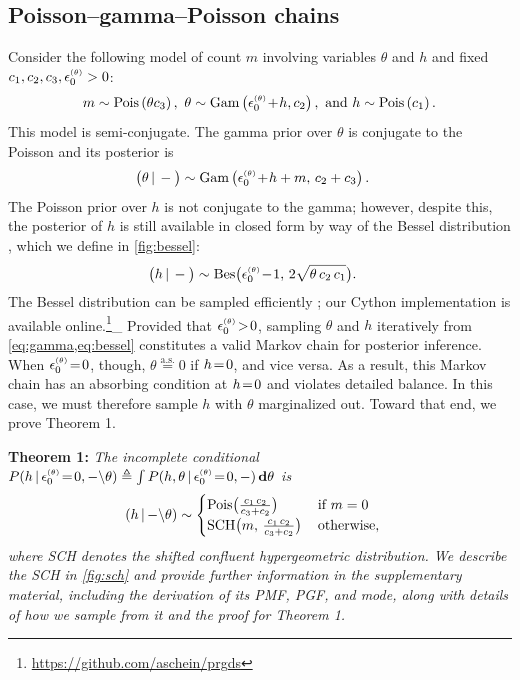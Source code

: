 \documentclass{article}
\begin{document}
\subsection{Poisson--gamma--Poisson chains}
\label{sec:recursion}
Consider the following model of count $m$ involving variables $\theta$ and $h$ and fixed $c_1, c_2, c_3, \epstheta >0$:
\begin{equation}
m \sim \Pois{\theta c_3},\,\,
%
\theta \sim \Gam{\epstheta \tp h, c_2},\,\,
%
\textrm{and}\,\, h \sim \Pois{c_1}.
\end{equation}
This model is semi-conjugate. The gamma prior over $\theta$ is conjugate to the Poisson and its posterior is
%
\begin{align}
\label{eq:gamma}
\compcond{\theta} &\sim \Gam{\epstheta \tp h + m,\, c_2 + c_3}.
\end{align}
The Poisson prior over $h$ is not conjugate to the gamma; however, despite this, the posterior of $h$ is still available in closed form by way of the Bessel distribution \cite{yuan2000bessel}, which we define in \cref{fig:bessel}:
\begin{align}
\label{eq:bessel}
\compcond{h} &\sim \textrm{Bes}\big(\epstheta \tm 1,\, 2\sqrt{\theta \,c_2\, c_1}\big).
\end{align}
The Bessel distribution can be sampled efficiently \cite{devroye2002simulating}; our Cython implementation is available online.\footnote{\url{https://github.com/aschein/prgds}}_
Provided that $\epstheta \!>\! 0$, sampling $\theta$ and $h$ iteratively from \cref{eq:gamma,eq:bessel} constitutes a valid Markov chain for posterior inference. When $\epstheta \teq 0$, though, $\theta \stackrel{\textrm{a.s.}}{=} 0$ if $h \!=\! 0$, and vice versa. As a result, this Markov chain has an absorbing condition at $h \!=\! 0$ and violates detailed balance. In this case, we must therefore sample $h$ with $\theta$ marginalized out. Toward that end, we prove Theorem 1.~

\textbf{Theorem 1:} \textit{The incomplete conditional $P(h\given{\epstheta \teq 0, -\backslash} \theta)\triangleq \int P(h,\theta\given \epstheta \teq 0, -)\,\mathbf{d}\theta$ is}~
\begin{align}
\label{eq:sch}
\left(h \,|\, {-\backslash} \theta\right) &\sim
\begin{cases}
\textrm{Pois}\big(\frac{c_1\,c_2}{c_3+c_2}\big) &\textrm{if }m=0\\
\textrm{SCH}\big(m,\, \frac{c_1\,c_2}{c_3+c_2}\big)\, &\textrm{otherwise,}
\end{cases}
\end{align}
\textit{where SCH denotes the shifted confluent hypergeometric distribution. We describe the SCH in \cref{fig:sch} and provide further information in the supplementary material, including the derivation of its PMF, PGF, and mode, along with details of how we sample from it and the proof for Theorem 1.}~
\end{document}
